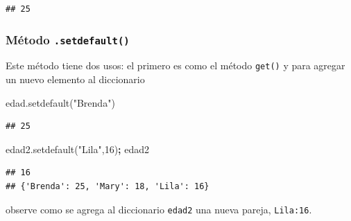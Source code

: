 \documentclass[
]{book}
\newenvironment{Shaded}{\begin{snugshade}}{\end{snugshade}}
\newcommand{\DecValTok}[1]{\textcolor[rgb]{0.00,0.00,0.81}{#1}}
\newcommand{\NormalTok}[1]{#1}
\newcommand{\OperatorTok}[1]{\textcolor[rgb]{0.81,0.36,0.00}{\textbf{#1}}}
\newcommand{\StringTok}[1]{\textcolor[rgb]{0.31,0.60,0.02}{#1}}
\theoremstyle{definition}
\theoremstyle{definition}
\theoremstyle{definition}
\theoremstyle{definition}
\theoremstyle{remark}
\begin{document}
\begin{verbatim}
## 25
\end{verbatim}

\hypertarget{muxe9todo-.setdefault}{%
\subsubsection{\texorpdfstring{Método \texttt{.setdefault()}}{Método .setdefault()}}\label{muxe9todo-.setdefault}}

Este método tiene dos usos: el primero es como el método \texttt{get()} y para agregar un nuevo elemento al diccionario

\begin{Shaded}
\begin{Highlighting}[]
\NormalTok{edad.setdefault(}\StringTok{"Brenda"}\NormalTok{)  }
\end{Highlighting}
\end{Shaded}

\begin{verbatim}
## 25
\end{verbatim}

\begin{Shaded}
\begin{Highlighting}[]
\NormalTok{edad2.setdefault(}\StringTok{"Lila"}\NormalTok{,}\DecValTok{16}\NormalTok{)}\OperatorTok{;}\NormalTok{ edad2   }
\end{Highlighting}
\end{Shaded}

\begin{verbatim}
## 16
## {'Brenda': 25, 'Mary': 18, 'Lila': 16}
\end{verbatim}

observe como se agrega al diccionario \texttt{edad2} una nueva pareja, \texttt{Lila:16}.
\end{document}
